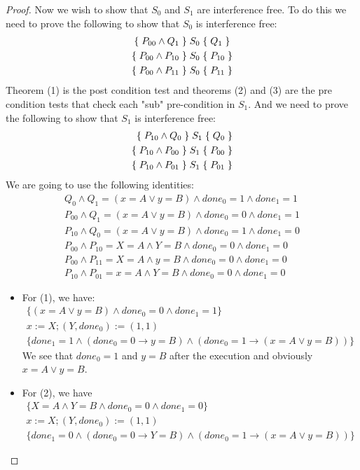 \begin{proof}
Now we wish to show that $S_0$ and $S_1$ are interference free. To do this we need to prove the following to show that $S_0$ is interference free:
\begin{gather}
{\{\;P_{00}\land Q_1\;\}\;S_0\;\{\;Q_1\;\}}\\
{\{\;P_{00}\land P_{10}\;\}\;S_0\;\{\;P_{10}\;\}}\\
{\{\;P_{00}\land P_{11}\;\}\;S_0\;\{\;P_{11}\;\}}
\end{gather}
Theorem (1) is the post condition test and theorems (2) and (3) are the pre condition tests that check each "sub" pre-condition in $S_1$. And we need to prove the following to show that $S_1$ is interference free:
\begin{align}
{\{\;P_{10}\land Q_0\;\}\;S_1\;\{\;Q_0\;\}}\\
{\{\;P_{10}\land P_{00}\;\}\;S_1\;\{\;P_{00}\;\}}\\
{\{\;P_{10}\land P_{01}\;\}\;S_1\;\{\;P_{01}\;\}}
\end{align}
We are going to use the following identities:
\begin{gather*}
Q_0\land Q_1=(x=A\lor y=B)\land done_0=1\land done_1=1 \\
P_{00}\land Q_1=(x=A\lor y=B)\land done_0=0\land done_1=1 \\
P_{10}\land Q_0=(x=A\lor y=B)\land done_0=1\land done_1=0 \\
P_{00}\land P_{10}=X=A\land Y=B\land done_0=0\land done_1=0 \\
P_{00}\land P_{11}=X=A\land y=B\land done_0=0\land done_1=0 \\
P_{10}\land P_{01}=x=A\land Y=B\land done_0=0\land done_1=0
\end{gather*}
\begin{itemize}
\item For (1), we have:
\begin{gather*}
\{(x=A\lor y=B)\land done_0=0\land done_1=1\}\\
x:=X;(Y,done_0):=(1,1)\\
\{done_1=1\land (done_0=0\rightarrow y=B)\land (done_0=1\rightarrow (x=A\lor y=B))\}
\end{gather*}
We see that $done_0=1$ and $y=B$ after the execution and obviously $x=A\lor y=B$.
\item For (2), we have
\begin{gather*}
\{X=A\land Y=B\land done_0=0\land done_1=0\}\\
x:=X;(Y,done_0):=(1,1)\\
\{done_1=0\land (done_0=0\rightarrow Y=B)\land (done_0=1\rightarrow (x=A\lor y=B))\}
\end{gather*}

\end{itemize}
\end{proof}
